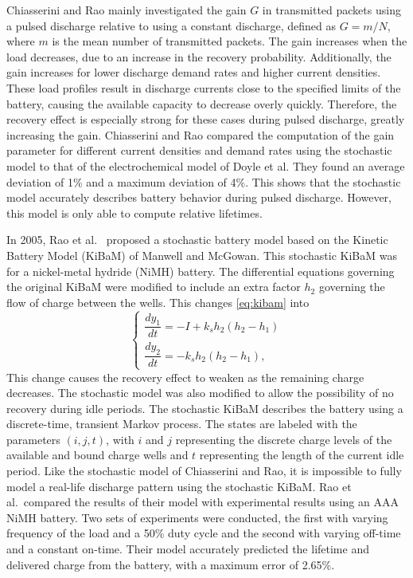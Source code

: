 \documentclass[../zhang_thesis.tex]{subfiles}
\begin{document}
Chiasserini and Rao mainly investigated the gain $G$ in transmitted packets using a pulsed discharge relative to using a constant discharge, defined as $G=m/N$, where $m$ is the mean number of transmitted packets. The gain increases when the load decreases, due to an increase in the recovery probability. Additionally, the gain increases for lower discharge demand rates and higher current densities. These load profiles result in discharge currents close to the specified limits of the battery, causing the
available capacity to decrease overly quickly. Therefore, the recovery effect is especially strong for these cases during pulsed discharge, greatly increasing the gain. Chiasserini and Rao compared the computation of the gain parameter for different current densities and demand rates using the stochastic model to that of the electrochemical model of Doyle et al. They found an average deviation of 1\% and a maximum deviation of 4\%. This shows that the stochastic model accurately describes battery behavior during pulsed discharge. However, this model is only able to compute relative lifetimes.

In 2005, Rao et al.~\cite{rao05} proposed a stochastic battery model based on the Kinetic Battery Model (KiBaM) of Manwell and McGowan. This stochastic KiBaM was for a nickel-metal hydride (NiMH) battery. The differential equations governing the original KiBaM were modified to include an extra factor $h_2$ governing the flow of charge between the wells. This changes \autoref{eq:kibam} into
\begin{equation}
    \begin{cases}
        \dfrac{dy_1}{dt} = -I + k_s h_2 \left( h_2 - h_1 \right) \\
        \dfrac{dy_2}{dt} = -k_s h_2 \left( h_2 - h_1 \right),
    \end{cases}
\end{equation}
This change causes the recovery effect to weaken as the remaining charge decreases. The stochastic model was also modified to allow the possibility of no recovery during idle periods. The stochastic KiBaM describes the battery using a discrete-time, transient Markov process. The states are labeled with the parameters $(i,j,t)$, with $i$ and $j$ representing the discrete charge levels of the available and bound charge wells and $t$ representing the length of the current idle period.
Like the stochastic model of Chiasserini and Rao, it is impossible to fully model a real-life discharge pattern using the stochastic KiBaM. Rao et al.\ compared the results of their model with experimental results using an AAA NiMH battery. Two sets of experiments were conducted, the first with varying frequency of the load and a 50\% duty cycle and the second with varying off-time and a constant on-time. Their model accurately predicted the lifetime and delivered charge from the
battery, with a maximum error of 2.65\%.
\end{document}

